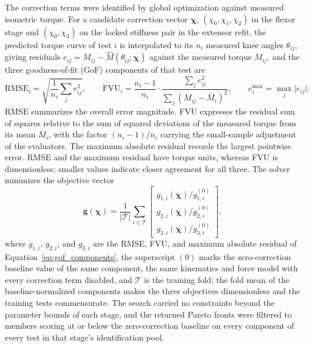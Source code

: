 \documentclass[utf8]{FrontiersinHarvard} %
\providecommand{\abs}[1]{\lvert#1\rvert}
\begin{document}
The correction terms were identified by global optimization against measured isometric torque. For a candidate correction vector $\boldsymbol{\chi}$, $(\chi_{0}, \chi_{1}, \chi_{2})$ in the flexor stage and $(\chi_{0}, \chi_{3})$ on the locked stiffness pair in the extensor refit, the predicted torque curve of test $i$ is interpolated to its $n_{i}$ measured knee angles $\theta_{ij}$, giving residuals $e_{ij} = M_{ij} - \hat{M}(\theta_{ij}; \boldsymbol{\chi})$ against the measured torque $M_{ij}$, and the three goodness-of-fit (GoF) components of that test are
\begin{equation}
\mathrm{RMSE}_{i} = \sqrt{\frac{1}{n_{i}}\sum_{j} e_{ij}^{2}}, \qquad
\mathrm{FVU}_{i} = \frac{n_{i}-1}{n_{i}} \cdot \frac{\sum_{j} e_{ij}^{2}}{\sum_{j} (M_{ij} - \bar{M}_{i})^{2}}, \qquad
e^{\max}_{i} = \max_{j} \abs{e_{ij}}.
\label{eq:gof_components}
\end{equation}
RMSE summarizes the overall error magnitude. FVU expresses the residual sum of squares relative to the sum of squared deviations of the measured torque from its mean $\bar{M}_{i}$, with the factor $(n_{i}-1)/n_{i}$ carrying the small-sample adjustment of the evaluators. The maximum absolute residual records the largest pointwise error. RMSE and the maximum residual have torque units, whereas FVU is dimensionless; smaller values indicate closer agreement for all three. The solver minimizes the objective vector
\begin{equation}
\mathbf{g}(\boldsymbol{\chi}) = \frac{1}{\abs{\mathcal{T}}} \sum_{i \in \mathcal{T}}
\begin{bmatrix}
g_{1,i}(\boldsymbol{\chi})/g_{1,i}^{(0)} \\
g_{2,i}(\boldsymbol{\chi})/g_{2,i}^{(0)} \\
g_{3,i}(\boldsymbol{\chi})/g_{3,i}^{(0)}
\end{bmatrix},
\label{eq:gof_objective}
\end{equation}
where $g_{1,i}$, $g_{2,i}$, and $g_{3,i}$ are the RMSE, FVU, and maximum absolute residual of Equation~\eqref{eq:gof_components}, the superscript $(0)$ marks the zero-correction baseline value of the same component, the same kinematics and force model with every correction term disabled, and $\mathcal{T}$ is the training fold; the fold mean of the baseline-normalized components makes the three objectives dimensionless and the training tests commensurate. The search carried no constraints beyond the parameter bounds of each stage, and the returned Pareto fronts were filtered to members scoring at or below the zero-correction baseline on every component of every test in that stage's identification pool.
\end{document}
